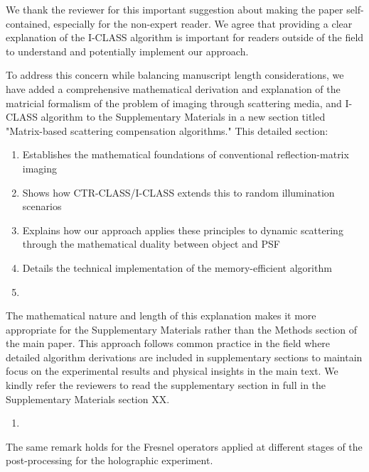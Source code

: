 \documentclass[12pt]{article}
\newenvironment{solved_reviewercomment}
    {\begin{tcolorbox}[width=\linewidth,colback=gray!5,colframe=solved_commentcolor!50,title=Reviewer Comment,left=5pt,right=5pt]}
    {\end{tcolorbox}}
\newenvironment{ourresponse}
    {\begin{tcolorbox}[width=\linewidth,breakable,enhanced,colback=gray!5,colframe=responsecolor!50,title=Response,left=5pt,right=5pt]}
    {\end{tcolorbox}}
\begin{document}
\begin{ourresponse}
We thank the reviewer for this important suggestion about making the paper self-contained, especially for the non-expert reader. We agree that providing a clear explanation of the I-CLASS algorithm is important for readers outside of the field to understand and potentially implement our approach.

To address this concern while balancing manuscript length considerations, we have added a comprehensive mathematical derivation and explanation of the matricial formalism of the problem of imaging through scattering media, and I-CLASS algorithm to the Supplementary Materials in a new section titled "Matrix-based scattering compensation algorithms." This detailed section:

\begin{enumerate}
    \item Establishes the mathematical foundations of conventional reflection-matrix imaging
    \item Shows how CTR-CLASS/I-CLASS extends this to random illumination scenarios
    \item Explains how our approach applies these principles to dynamic scattering through the mathematical duality between object and PSF
    \item Details the technical implementation of the memory-efficient algorithm
    \item \end{enumerate}

The mathematical nature and length of this explanation makes it more appropriate for the Supplementary Materials rather than the Methods section of the main paper. This approach follows common practice in the field where detailed algorithm derivations are included in supplementary sections to maintain focus on the experimental results and physical insights in the main text.
We kindly refer the reviewers to read the supplementary section in full in the Supplementary Materials section XX.

\end{ourresponse}


\begin{enumerate}[label=\arabic*., resume]
\item \leavevmode
\end{enumerate}
\vspace{-1em}
\begin{solved_reviewercomment}
    The same remark holds for the Fresnel operators applied at different stages of the post-processing for the holographic experiment.
\end{solved_reviewercomment}
\end{document}
